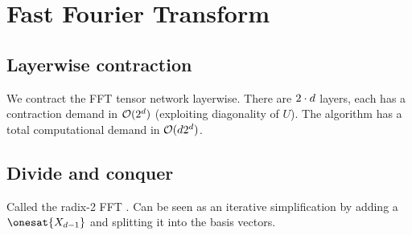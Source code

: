 \section{Fast Fourier Transform}

\subsection{Layerwise contraction}

We contract the FFT tensor network layerwise.
There are $2\cdot d$ layers, each has a contraction demand in $\mathcal{O}(2^{d})$ (exploiting diagonality of $U$).
The algorithm has a total computational demand in $\mathcal{O}(d2^{d})$.

\subsection{Divide and conquer}

Called the radix-2 FFT \cite{cooley_algorithm_1965}.
Can be seen as an iterative simplification by adding a $\onesat{\catvariableof{\catorder-1}}$ and splitting it into the basis vectors.


